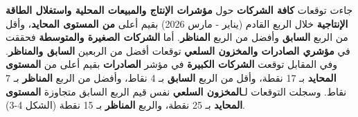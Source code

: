 جاءت توقعات \textbf{كافة الشركات} حول \textbf{مؤشرات الإنتاج والمبيعات المحلية واستغلال الطاقة الإنتاجية} خلال الربع القادم (يناير - مارس 2026) بقيم أعلى \textbf{من المستوى المحايد}، وأقل من الربع \textbf{السابق} وأفضل من الربع \textbf{المناظر}. أما \textbf{الشركات الصغيرة والمتوسطة} فحققت في \textbf{مؤشري الصادرات والمخزون السلعي} توقعات أفضل من الربعين \textbf{السابق والمناظر}. وفي المقابل توقعت \textbf{الشركات الكبيرة} في مؤشر \textbf{الصادرات} بقيم أعلى من \textbf{المستوى المحايد} بـ 17 نقطة، وأقل من الربع \textbf{السابق} بـ 4 نقاط، وأفضل من الربع \textbf{المناظر} بـ 7 نقاط. وسجلت التوقعات لـ\textbf{المخزون السلعي} نفس قيم الربع السابق متجاوزة \textbf{المستوى المحايد} بـ 25 نقطة، والربع \textbf{المناظر} بـ 15 نقطة (الشكل 4-3).
